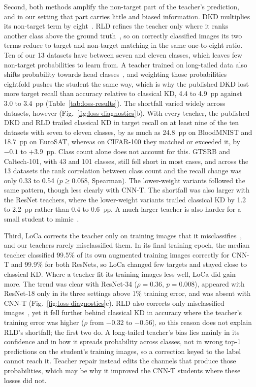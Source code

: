 \documentclass[review,number,sort&compress]{elsarticle}
\theoremstyle{definition}
\begin{document}
Second, both methods amplify the non-target part of the teacher's
prediction, and in our setting that part carries little and biased
information. DKD multiplies its non-target term by
eight~\citep{zhao2022decoupled}. RLD refines the teacher only where it
ranks another class above the ground truth~\citep{sun2025knowledge}, so
on correctly classified images its two terms reduce to target and
non-target matching in the same one-to-eight ratio. Ten of our 13
datasets have between seven and eleven classes, which leaves few
non-target probabilities to learn from. A teacher trained on
long-tailed data also shifts probability towards head
classes~\citep{huang2025learn}, and weighting those
probabilities eightfold pushes the student the same way, which is why
the published DKD lost more target recall than accuracy relative to
classical KD, 4.4 to 4.9~pp against 3.0 to 3.4~pp
(Table~\ref{tab:loss-results}). The shortfall varied widely across
datasets, however (Fig.~\ref{fig:loss-diagnostics}b). With every
teacher, the published DKD and RLD trailed classical KD in target
recall on at least nine of the ten datasets with seven to eleven
classes, by as much as 24.8~pp on BloodMNIST and 18.7~pp on EuroSAT,
whereas on CIFAR-100 they matched or exceeded it, by $-0.1$ to
$+3.9$~pp. Class count alone does not account for this. GTSRB and
Caltech-101, with 43 and 101 classes, still fell short in most cases,
and across the 13 datasets the rank correlation between class count
and the recall change was only 0.33 to 0.54 ($p\geq0.058$, Spearman).
The lower-weight variants followed the same pattern, though less clearly
with CNN-T. The shortfall was also larger with the ResNet teachers, where the
lower-weight variants trailed classical KD by 1.2 to 2.2~pp rather than
0.4 to 0.6~pp. A much larger teacher is also harder for a small
student to mimic~\citep{cho2019efficacy}.

Third, LoCa corrects the teacher only on training images that it
misclassifies~\citep{yang2024loca}, and our teachers rarely
misclassified them. In its final training epoch, the median teacher
classified 99.5\% of its own augmented training images correctly for
CNN-T and 99.9\% for both ResNets, so LoCa changed few targets and
stayed close to classical KD. Where a teacher fit its training images
less well, LoCa did gain more. The trend was clear with ResNet-34
($\rho=0.36$, $p=0.008$), appeared with ResNet-18 only in its three
settings above 1\% training error, and was absent with CNN-T
(Fig.~\ref{fig:loss-diagnostics}c). RLD also corrects only misclassified
images~\citep{sun2025knowledge}, yet it fell further behind classical KD
in accuracy where the teacher's training error was higher ($\rho$ from
$-0.32$ to $-0.56$), so this reason does not explain RLD's shortfall;
the first two do. A long-tailed teacher's bias
lies mainly in its confidence and in how it spreads probability across
classes, not in wrong top-1 predictions on the student's training
images, so a correction keyed to the label cannot reach it. Teacher repair instead edits the channels that produce those
probabilities, which may be why it improved the CNN-T students where
these losses did not.
\end{document}
